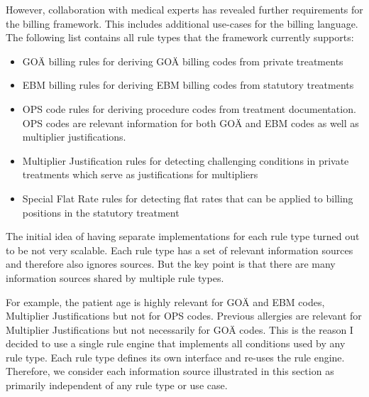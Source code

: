 However, collaboration with medical experts has revealed further requirements for the billing framework.
This includes additional use-cases for the billing language.
The following list contains all rule types that the framework currently supports:
\begin{itemize}
    \item GOÄ billing rules for deriving GOÄ billing codes from private treatments
    \item EBM billing rules for deriving EBM billing codes from statutory treatments
    \item OPS code rules for deriving procedure codes from treatment documentation.
    OPS codes are relevant information for both GOÄ and EBM codes as well as multiplier justifications.
    \item Multiplier Justification rules for detecting challenging conditions in private treatments
    which serve as justifications for multipliers
    \item Special Flat Rate rules
    for detecting flat rates that can be applied to billing positions in the statutory treatment
\end{itemize}

The initial idea of having separate implementations for each rule type turned out to be not very scalable.
Each rule type has a set of relevant information sources and therefore also ignores sources.
But the key point is that there are many information sources shared by multiple rule types.

For example, the patient age is highly relevant for GOÄ and EBM codes, Multiplier Justifications but not for OPS codes.
Previous allergies are relevant for Multiplier Justifications but not necessarily for GOÄ codes.
This is the reason I decided to use a single rule engine that implements all conditions used by any rule type.
Each rule type defines its own interface and re-uses the rule engine.
Therefore,
we consider each information source illustrated in this section as primarily independent of any rule type or use case.

